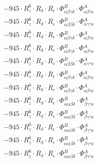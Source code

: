 \documentclass{article}
\begin{document}
\begin{subequations}
\begin{gather}
\begin{array}{c}
 \\[0.2em] 		 - 945 \cdot R_{z}^{6} \cdot R_{\delta{}} \cdot R_{\epsilon{}} \cdot \Phi{}^{B}_{\alpha{}\beta{}\gamma{}\delta{}} \cdot \Phi{}^{A}_{\alpha{}\beta{}\gamma{}\epsilon{}} 
 \\[0.2em] 		 - 945 \cdot R_{z}^{6} \cdot R_{\delta{}} \cdot R_{\epsilon{}} \cdot \Phi{}^{B}_{\alpha{}\beta{}\beta{}\delta{}} \cdot \Phi{}^{A}_{\alpha{}\gamma{}\gamma{}\epsilon{}} 
 \\[0.2em] 		 - 945 \cdot R_{z}^{6} \cdot R_{\delta{}} \cdot R_{\epsilon{}} \cdot \Phi{}^{B}_{\alpha{}\beta{}\gamma{}\delta{}} \cdot \Phi{}^{A}_{\alpha{}\beta{}\gamma{}\epsilon{}} 
 \\[0.2em] 		 - 945 \cdot R_{z}^{6} \cdot R_{\delta{}} \cdot R_{\epsilon{}} \cdot \Phi{}^{B}_{\alpha{}\beta{}\gamma{}\delta{}} \cdot \Phi{}^{A}_{\alpha{}\beta{}\gamma{}\epsilon{}} 
 \\[0.2em] 		 - 945 \cdot R_{z}^{6} \cdot R_{\delta{}} \cdot R_{\epsilon{}} \cdot \Phi{}^{B}_{\alpha{}\beta{}\beta{}\delta{}} \cdot \Phi{}^{A}_{\alpha{}\gamma{}\gamma{}\epsilon{}} 
 \\[0.2em] 		 - 945 \cdot R_{z}^{6} \cdot R_{\delta{}} \cdot R_{\epsilon{}} \cdot \Phi{}^{B}_{\alpha{}\beta{}\gamma{}\delta{}} \cdot \Phi{}^{A}_{\alpha{}\beta{}\gamma{}\epsilon{}} 
 \\[0.2em] 		 - 945 \cdot R_{z}^{6} \cdot R_{\delta{}} \cdot R_{\epsilon{}} \cdot \Phi{}^{B}_{\alpha{}\beta{}\gamma{}\delta{}} \cdot \Phi{}^{A}_{\alpha{}\beta{}\gamma{}\epsilon{}} 
 \\[0.2em] 		 - 945 \cdot R_{z}^{6} \cdot R_{\delta{}} \cdot R_{\epsilon{}} \cdot \Phi{}^{B}_{\alpha{}\alpha{}\beta{}\delta{}} \cdot \Phi{}^{A}_{\beta{}\gamma{}\gamma{}\epsilon{}} 
 \\[0.2em] 		 - 945 \cdot R_{z}^{6} \cdot R_{\delta{}} \cdot R_{\epsilon{}} \cdot \Phi{}^{B}_{\alpha{}\alpha{}\beta{}\delta{}} \cdot \Phi{}^{A}_{\beta{}\gamma{}\gamma{}\epsilon{}} 
 \\[0.2em] 		 - 945 \cdot R_{z}^{6} \cdot R_{\delta{}} \cdot R_{\epsilon{}} \cdot \Phi{}^{B}_{\alpha{}\alpha{}\beta{}\delta{}} \cdot \Phi{}^{A}_{\beta{}\gamma{}\gamma{}\epsilon{}} 
 \\[0.2em] 		 - 945 \cdot R_{z}^{6} \cdot R_{\delta{}} \cdot R_{\epsilon{}} \cdot \Phi{}^{B}_{\alpha{}\alpha{}\beta{}\delta{}} \cdot \Phi{}^{A}_{\beta{}\gamma{}\gamma{}\epsilon{}} 
 \\[0.2em] 		 - 945 \cdot R_{z}^{6} \cdot R_{\delta{}} \cdot R_{\epsilon{}} \cdot \Phi{}^{B}_{\alpha{}\alpha{}\beta{}\delta{}} \cdot \Phi{}^{A}_{\beta{}\gamma{}\gamma{}\epsilon{}} 

\end{array}
\end{gather}
\end{subequations}
\end{document}
